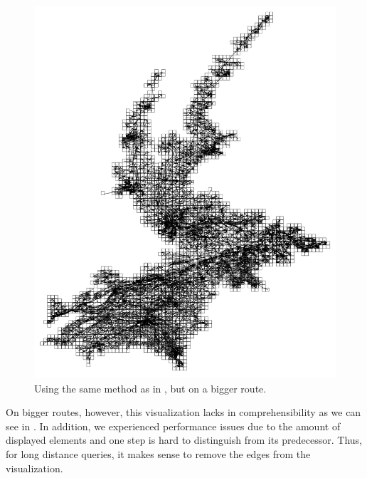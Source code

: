 \documentclass
[
    paper = a4,
    pagesize,
    12 pt,
    twoside,                       %
    open = right,
    DIV = calc,
    BCOR = 0 mm,                   %
    bibtotoc
]
{scrbook}
\begin{document}
\begin{figure}
    \includegraphics[width=\textwidth]{Images/vis-rectangular-tiles.png}
\caption[]{Using the same method as in , but on a bigger route.}
\label{fig:rectangle_tiles_big}
\end{figure}

On bigger routes, however, this visualization lacks in comprehensibility as we can see in .
In addition, we experienced performance issues due to the amount of displayed elements and one step is hard to distinguish from its predecessor.
Thus, for long distance queries, it makes sense to remove the edges from the visualization.
\end{document}
